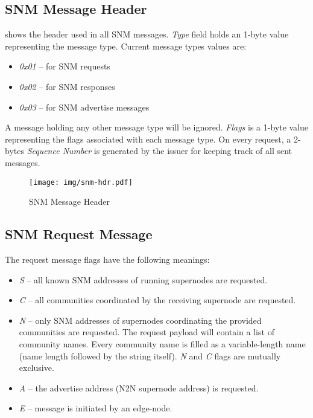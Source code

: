 
\subsection{SNM Message Header}
\label{sub-sec:snm-header}
 shows the header used in all SNM messages. \emph{Type} field holds an 1-byte value representing the message type. Current message types values are:
\begin{itemize}
\item \emph{0x01} – for SNM requests
\item \emph{0x02} – for SNM responses
\item \emph{0x03} – for SNM advertise messages
\end{itemize}
A message holding any other message type will be ignored. \emph{Flags} is a 1-byte value representing the flags associated with each message type. On every request, a 2-bytes \emph{Sequence Number} is generated by the issuer for keeping track of all sent messages.

\begin{figure}[hbtp]
\begin{center}
\texttt{[image: img/snm-hdr.pdf]}
\caption{SNM Message Header \label{img:snm-hdr}}
\end{center}
\end{figure}

\subsection{SNM Request Message}
\label{sub-sec:snm-request}
The request message flags have the following meanings:
\begin{itemize}
\item \emph{S} – all known SNM addresses of running supernodes are requested.
\item \emph{C} – all communities coordinated by the receiving supernode are requested.
\item \emph{N} – only SNM addresses of supernodes coordinating the provided communities are requested. The request payload will contain a list of community names. Every community name is filled as a variable-length name (name length followed by the string itself). \emph{N} and \emph{C} flags are mutually exclusive.
\item \emph{A} – the advertise address (N2N supernode address) is requested.
\item \emph{E} – message is initiated by an edge-node.
\end{itemize}

